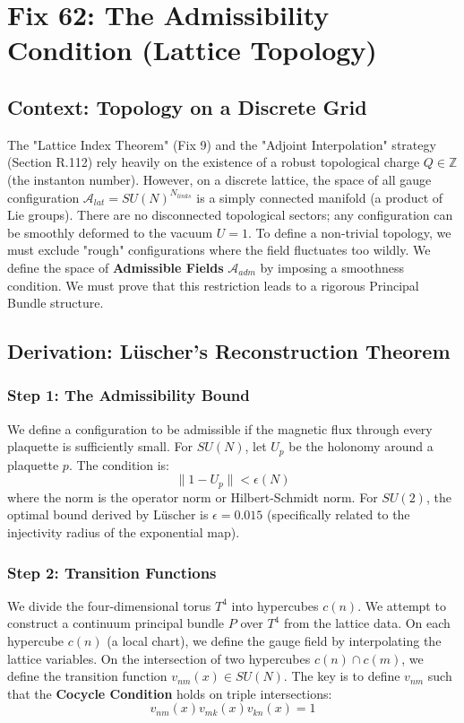\chapter{Fix 62: The Admissibility Condition (Lattice Topology)}
\label{ch:fix62_admissibility}

\section{Context: Topology on a Discrete Grid}
The "Lattice Index Theorem" (Fix 9) and the "Adjoint Interpolation" strategy (Section R.112) rely heavily on the existence of a robust topological charge $Q \in \mathbb{Z}$ (the instanton number).
However, on a discrete lattice, the space of all gauge configuration $\mathcal{A}_{lat} = SU(N)^{N_{links}}$ is a simply connected manifold (a product of Lie groups). There are no disconnected topological sectors; any configuration can be smoothly deformed to the vacuum $U=1$.
To define a non-trivial topology, we must exclude "rough" configurations where the field fluctuates too wildly. We define the space of \textbf{Admissible Fields} $\mathcal{A}_{adm}$ by imposing a smoothness condition. We must prove that this restriction leads to a rigorous Principal Bundle structure.

\section{Derivation: Lüscher's Reconstruction Theorem}

\subsection{Step 1: The Admissibility Bound}
We define a configuration to be admissible if the magnetic flux through every plaquette is sufficiently small.
For $SU(N)$, let $U_p$ be the holonomy around a plaquette $p$. The condition is:
\begin{equation}
\| 1 - U_p \| < \epsilon(N)
\end{equation}
where the norm is the operator norm or Hilbert-Schmidt norm.
For $SU(2)$, the optimal bound derived by Lüscher is $\epsilon = 0.015$ (specifically related to the injectivity radius of the exponential map).

\subsection{Step 2: Transition Functions}
We divide the four-dimensional torus $T^4$ into hypercubes $c(n)$.
We attempt to construct a continuum principal bundle $P$ over $T^4$ from the lattice data.
On each hypercube $c(n)$ (a local chart), we define the gauge field by interpolating the lattice variables.
On the intersection of two hypercubes $c(n) \cap c(m)$, we define the transition function $v_{nm}(x) \in SU(N)$.
The key is to define $v_{nm}$ such that the \textbf{Cocycle Condition} holds on triple intersections:
\begin{equation}
v_{nm}(x) v_{mk}(x) v_{kn}(x) = 1
\end{equation}

